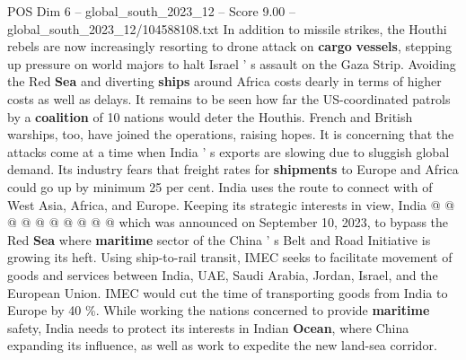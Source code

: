 \begin{textsample}{POS Dim 6 – global\_south\_2023\_12 – Score 9.00 – global\_south\_2023\_12/104588108.txt}
In addition to missile strikes, the Houthi rebels are now increasingly resorting to drone attack on \textbf{cargo} \textbf{vessels}, stepping up pressure on world majors to halt Israel ' s assault on the Gaza Strip.
Avoiding the Red \textbf{Sea} and diverting \textbf{ships} around Africa costs dearly in terms of higher costs as well as delays.
It remains to be seen how far the US-coordinated patrols by a \textbf{coalition} of 10 nations would deter the Houthis.
French and British warships, too, have joined the operations, raising hopes.
It is concerning that the attacks come at a time when India ' s exports are slowing due to sluggish global demand.
Its industry fears that freight rates for \textbf{shipments} to Europe and Africa could go up by minimum 25 per cent.
India uses the route to connect with of West Asia, Africa, and Europe.
Keeping its strategic interests in view, India @ @ @ @ @ @ @ @ @ @ which was announced on September 10, 2023, to bypass the Red \textbf{Sea} where \textbf{maritime} sector of the China ' s Belt and Road Initiative is growing its heft.
Using ship-to-rail transit, IMEC seeks to facilitate movement of goods and services between India, UAE, Saudi Arabia, Jordan, Israel, and the European Union.
IMEC would cut the time of transporting goods from India to Europe by 40 \%.
While working the nations concerned to provide \textbf{maritime} safety, India needs to protect its interests in Indian \textbf{Ocean}, where China expanding its influence, as well as work to expedite the new land-sea corridor.

\end{textsample}

